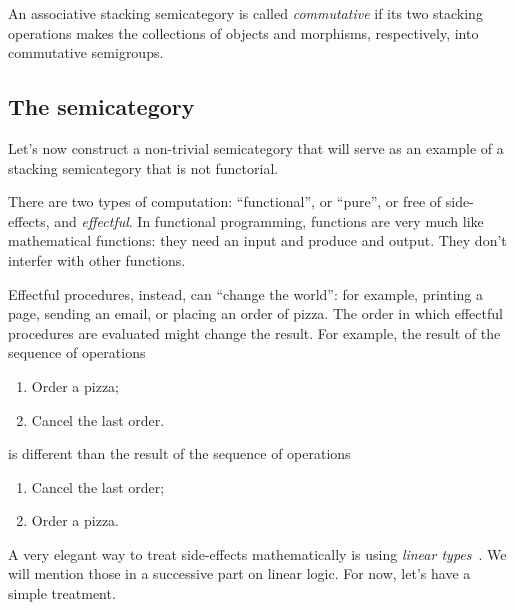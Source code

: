 \begin{definition}
    An associative stacking semicategory is called \emph{commutative} if its two stacking operations makes the collections of objects and morphisms, respectively, into commutative semigroups.
\end{definition}

\subsection{The semicategory \Effects}

Let's now construct a non-trivial semicategory that will serve as an example of a stacking semicategory that is not functorial.

There are two types of computation: ``functional'', or ``pure'', or free of side-effects, and \emph{effectful}.
In functional programming, functions are very much like mathematical functions: they need an input and produce and output.
They don't interfer with other functions.

Effectful procedures,  instead, can ``change the world'': for example, printing a page, sending an email, or placing an order of pizza.
The order in which effectful procedures are evaluated might change the result.
For example, the result of the sequence of operations
%
\begin{enumerate}
    \item Order a pizza;
    \item Cancel the last order.
\end{enumerate}
%
is different than the result of the sequence of operations
%
\begin{enumerate}
    \item Cancel the last order;
    \item Order a pizza.
\end{enumerate}

A very elegant way to treat side-effects mathematically is using \emph{linear types}~\cite{Wadler90lineartypes}.
We will mention those in a successive part on linear logic.
For now, let's have a simple treatment.

\begin{marginfigure}
    \centering
    \\
    \caption{}
    \label{fig:effects12}
\end{marginfigure}

